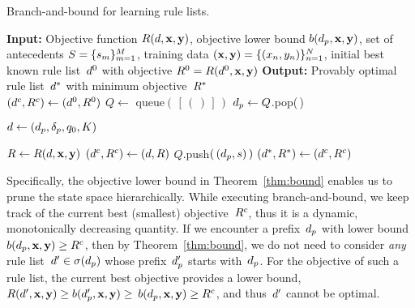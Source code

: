 \begin{algorithm}[t!]
\caption{Branch-and-bound for learning rule lists.}
\label{alg:branch-and-bound}
\begin{algorithmic}
\normalsize
\State \textbf{Input:} Objective function $R({d}, \mathbf{x}, \mathbf{y})$,
objective lower bound ${b(d_p, \mathbf{x}, \mathbf{y})}$,
set of antecedents ${S = \{s_m\}_{m=1}^M}$,
training data $(\mathbf{x}, \mathbf{y}) = {\{(x_n, y_n)\}_{n=1}^N}$,
initial best known rule list~$d^0$ with objective
${R^0 = R(d^0, \mathbf{x}, \mathbf{y})}$
\State \textbf{Output:} Provably optimal rule list~$d^*$ with minimum objective~$R^*$ \\

\State $(d^c, {R^c}) \gets (d^0, R^0)$ 
\State $Q \gets $ queue$(\,[\,(\,)\,]\,)$ 
 
	\State $d_p \gets Q$.pop(\,) 
	\begin{arxiv}
	\State ${d} \gets (d_p, \delta_p, q_0, K)$ 
	\end{arxiv}
	 
        \State $R \gets R({d}, \mathbf{x}, \mathbf{y})$ 
        \If {$\Obj < \CurrentObj$} 
            \State $(d^c, {R^c}) \gets ({d}, R)$
        \EndIf
         
                \State $Q$.push$(\,(d_p, s)\,)$
            \EndIf
        \EndFor
    \EndIf
\EndWhile
\State $(d^*, R^*) \gets (d^c, {R^c})$ 
\end{algorithmic}
\end{algorithm}

Specifically, the objective lower bound in Theorem~\ref{thm:bound}
enables us to prune the state space hierarchically.
%
While executing branch-and-bound, we keep track of the current best (smallest)
objective~${R^c}$, thus it is a dynamic, monotonically decreasing quantity.
%
If we encounter a prefix~$d_p$ with lower bound
${b(d_p, \mathbf{x}, \mathbf{y}) \ge {R^c}}$,
then by Theorem~\ref{thm:bound}, we do not need to consider \emph{any}
rule list~${{d}' \in \sigma(d_p)}$ whose prefix~$d_p'$ starts with~$d_p$.
%
For the objective of such a rule list, the current best objective
provides a lower bound, \ie
${R({d}', \mathbf{x}, \mathbf{y}) \ge b(d_p', \mathbf{x}, \mathbf{y}) \ge}$ ${b(d_p, \mathbf{x}, \mathbf{y}) \ge {R^c}}$,
and thus~${d}'$ cannot be optimal.
